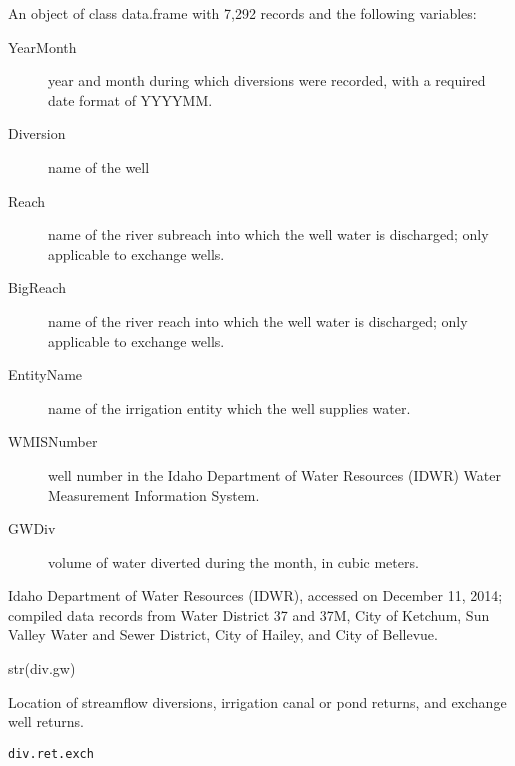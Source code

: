 \documentclass[a4paper]{book}
\begin{document}
\begin{Format}
An object of class data.frame with 7,292 records and the following variables:
\begin{description}

\item[YearMonth] year and month during which diversions were recorded,
with a required date format of YYYYMM.
\item[Diversion] name of the well
\item[Reach] name of the river subreach into which the well water is discharged;
only applicable to exchange wells.
\item[BigReach] name of the river reach into which the well water is discharged;
only applicable to exchange wells.
\item[EntityName] name of the irrigation entity which the well supplies water.
\item[WMISNumber] well number in the Idaho Department of Water Resources (IDWR)
Water Measurement Information System.
\item[GWDiv] volume of water diverted during the month, in cubic meters.

\end{description}

\end{Format}
%
\begin{Source}\relax
Idaho Department of Water Resources (IDWR), accessed on December 11, 2014;
compiled data records from Water District 37 and 37M, City of Ketchum,
Sun Valley Water and Sewer District, City of Hailey, and City of Bellevue.
\end{Source}
%
\begin{Examples}
\begin{ExampleCode}
str(div.gw)

\end{ExampleCode}
\end{Examples}
%
\begin{Description}\relax
Location of streamflow diversions, irrigation canal or pond returns, and
exchange well returns.
\end{Description}
%
\begin{Usage}
\begin{verbatim}
div.ret.exch
\end{verbatim}
\end{Usage}
%
\end{document}
